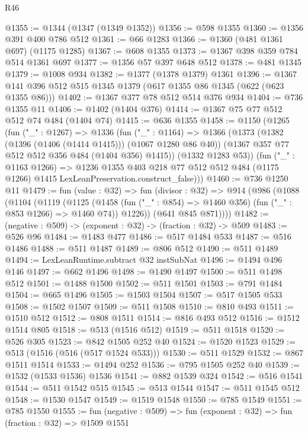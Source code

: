 \begin{lexlean}{R46}
\begin{coremodule}
@1355 := @1344 (@1347 (@1349 @1352))
@1356 := @598 @1355
@1360 := @1356 @391 @400 @786 @512
@1361 := @66 @1283
@1366 := @1360 (@481 @1361 @697) (@1175 @1285)
@1367 := @608 @1355
@1373 := @1367 @398 @359 @784 @514 @1361 @697
@1377 := @1356 @57 @397 @648 @512
@1378 := @481 @1345
@1379 := @1008 @934
@1382 := @1377 (@1378 @1379) @1361
@1396 := @1367 @141 @396 @512 @515 @1345 @1379 (@617 @1355 @86 @1345 (@622 (@623 @1355 @86)))
@1402 := @1367 @377 @78 @512 @514 @376 @934
@1404 := @736 @1355 @11
@1406 := @1402 (@1404 @376)
@1414 := @1367 @75 @77 @512 @512 @74 @484 (@1404 @74)
@1415 := @636 @1355
@1458 := @1150
    (@1265
      (fun ("_" : @1267) =>
      @1336
        (fun ("_" : @1164) =>
        @1366
          (@1373
            (@1382 (@1396 (@1406 (@1414 @1415))) (@1067 @1280 @86 @40))
            (@1367 @357 @77 @512 @512 @356 @484 (@1404 @356) @1415))
          (@1332 @1283 @53))
        (fun ("_" : @1163 @1266) =>
        @1236
          @1355
          @403
          @218
          @77
          @512
          @512
          @484
          (@1175 @1266)
          @1415
          LexLeanPreservation.construct_false)))
@1460 := @736 @1250 @11
@1479 := fun (value : @32) =>
  fun (divisor : @32) =>
  @914
    (@986
      (@1088
        (@1104
          (@1119
            (@1125
              (@1458 (fun ("_" : @854) => @1460 @356) (fun ("_" : @853 @1266) => @1460 @74))
              @1226))
          (@641 @845 @871))))
@1482 := (negative : @509) -> (exponent : @32) -> (fraction : @32) -> @509
@1483 := @526 @96
@1484 := @1483 @477
@1486 := @517 @1484 @533
@1487 := @516 @1486
@1488 := @511 @1487
@1489 := @806 @512
@1490 := @511 @1489
@1494 := LexLeanRuntime.subtract @32 instSubNat
@1496 := @1494 @496 @146
@1497 := @662 @1496
@1498 := @1490 @1497
@1500 := @511 @1498 @512
@1501 := @1488 @1500
@1502 := @511 @1501
@1503 := @791 @1484
@1504 := @665 @1496
@1505 := @1503 @1504
@1507 := @517 @1505 @533
@1508 := @1502 @1507
@1509 := @511 @1508
@1510 := @810 @493
@1511 := @1510 @512
@1512 := @808 @1511
@1514 := @816 @493 @512
@1516 := @1512 @1514 @805
@1518 := @513 (@1516 @512)
@1519 := @511 @1518
@1520 := @526 @305
@1523 := @842 @1505 @252 @40
@1524 := @1520 @1523
@1529 := @513 (@1516 (@516 (@517 @1524 @533)))
@1530 := @511 @1529
@1532 := @867 @1511 @1514
@1533 := @1494 @252
@1536 := @795 @1505 @252 @40
@1539 := @1532 (@1533 @1536) @1536
@1541 := @882 @1539 @324
@1542 := @516 @1541
@1544 := @511 @1542 @515
@1545 := @513 @1544
@1547 := @511 @1545 @512
@1548 := @1530 @1547
@1549 := @1519 @1548
@1550 := @785 @1549
@1551 := @785 @1550
@1555 := fun (negative : @509) => fun (exponent : @32) => fun (fraction : @32) => @1509 @1551

\end{coremodule}
\end{lexlean}
